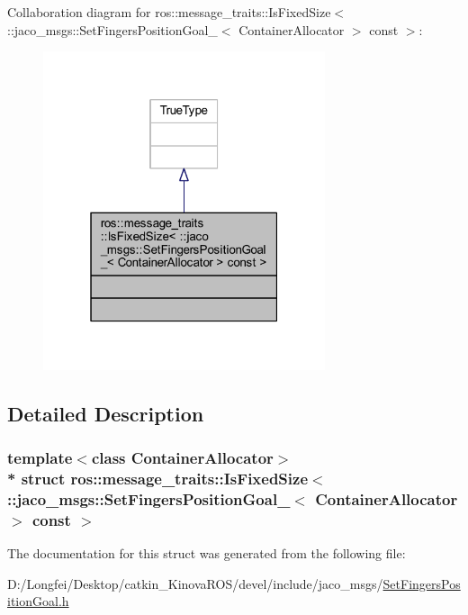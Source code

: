 Collaboration diagram for ros\+:\+:message\+\_\+traits\+:\+:Is\+Fixed\+Size$<$ \+:\+:jaco\+\_\+msgs\+:\+:Set\+Fingers\+Position\+Goal\+\_\+$<$ Container\+Allocator $>$ const $>$\+:
\nopagebreak
\begin{figure}[H]
\begin{center}
\leavevmode
\includegraphics[width=235pt]{dc/d6c/structros_1_1message__traits_1_1IsFixedSize_3_01_1_1jaco__msgs_1_1SetFingersPositionGoal___3_01Cbdf9742d0b7ad11091f8c01cb9dcf64b}
\end{center}
\end{figure}


\subsection{Detailed Description}
\subsubsection*{template$<$class Container\+Allocator$>$\\*
struct ros\+::message\+\_\+traits\+::\+Is\+Fixed\+Size$<$ \+::jaco\+\_\+msgs\+::\+Set\+Fingers\+Position\+Goal\+\_\+$<$ Container\+Allocator $>$ const  $>$}



The documentation for this struct was generated from the following file\+:\begin{DoxyCompactItemize}
\item 
D\+:/\+Longfei/\+Desktop/catkin\+\_\+\+Kinova\+R\+O\+S/devel/include/jaco\+\_\+msgs/\hyperlink{SetFingersPositionGoal_8h}{Set\+Fingers\+Position\+Goal.\+h}\end{DoxyCompactItemize}

